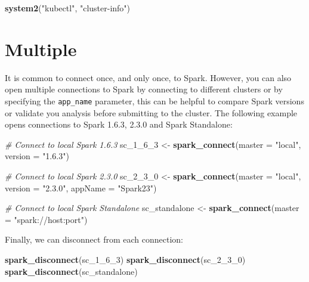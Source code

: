 \documentclass[]{book}
\newenvironment{Shaded}{\begin{snugshade}}{\end{snugshade}}
\newcommand{\CommentTok}[1]{\textcolor[rgb]{0.56,0.35,0.01}{\textit{#1}}}
\newcommand{\DataTypeTok}[1]{\textcolor[rgb]{0.13,0.29,0.53}{#1}}
\newcommand{\DecValTok}[1]{\textcolor[rgb]{0.00,0.00,0.81}{#1}}
\newcommand{\KeywordTok}[1]{\textcolor[rgb]{0.13,0.29,0.53}{\textbf{#1}}}
\newcommand{\NormalTok}[1]{#1}
\newcommand{\StringTok}[1]{\textcolor[rgb]{0.31,0.60,0.02}{#1}}
\theoremstyle{definition}
\theoremstyle{definition}
\theoremstyle{definition}
\theoremstyle{remark}
\begin{document}
\begin{Shaded}
\begin{Highlighting}[]
\KeywordTok{system2}\NormalTok{(}\StringTok{"kubectl"}\NormalTok{, }\StringTok{"cluster-info"}\NormalTok{)}
\end{Highlighting}
\end{Shaded}

\hypertarget{multiple}{%
\section{Multiple}\label{multiple}}

It is common to connect once, and only once, to Spark. However, you can
also open multiple connections to Spark by connecting to different
clusters or by specifying the \texttt{app\_name} parameter, this can be
helpful to compare Spark versions or validate you analysis before
submitting to the cluster. The following example opens connections to
Spark 1.6.3, 2.3.0 and Spark Standalone:

\begin{Shaded}
\begin{Highlighting}[]
\CommentTok{# Connect to local Spark 1.6.3}
\NormalTok{sc_}\DecValTok{1}\NormalTok{_}\DecValTok{6}\NormalTok{_}\DecValTok{3}\NormalTok{ <-}\StringTok{ }\KeywordTok{spark_connect}\NormalTok{(}\DataTypeTok{master =} \StringTok{"local"}\NormalTok{, }\DataTypeTok{version =} \StringTok{"1.6.3"}\NormalTok{)}

\CommentTok{# Connect to local Spark 2.3.0}
\NormalTok{sc_}\DecValTok{2}\NormalTok{_}\DecValTok{3}\NormalTok{_}\DecValTok{0}\NormalTok{ <-}\StringTok{ }\KeywordTok{spark_connect}\NormalTok{(}\DataTypeTok{master =} \StringTok{"local"}\NormalTok{, }\DataTypeTok{version =} \StringTok{"2.3.0"}\NormalTok{, }\DataTypeTok{appName =} \StringTok{"Spark23"}\NormalTok{)}

\CommentTok{# Connect to local Spark Standalone}
\NormalTok{sc_standalone <-}\StringTok{ }\KeywordTok{spark_connect}\NormalTok{(}\DataTypeTok{master =} \StringTok{"spark://host:port"}\NormalTok{)}
\end{Highlighting}
\end{Shaded}

Finally, we can disconnect from each connection:

\begin{Shaded}
\begin{Highlighting}[]
\KeywordTok{spark_disconnect}\NormalTok{(sc_}\DecValTok{1}\NormalTok{_}\DecValTok{6}\NormalTok{_}\DecValTok{3}\NormalTok{)}
\KeywordTok{spark_disconnect}\NormalTok{(sc_}\DecValTok{2}\NormalTok{_}\DecValTok{3}\NormalTok{_}\DecValTok{0}\NormalTok{)}
\KeywordTok{spark_disconnect}\NormalTok{(sc_standalone)}
\end{Highlighting}
\end{Shaded}
\end{document}
